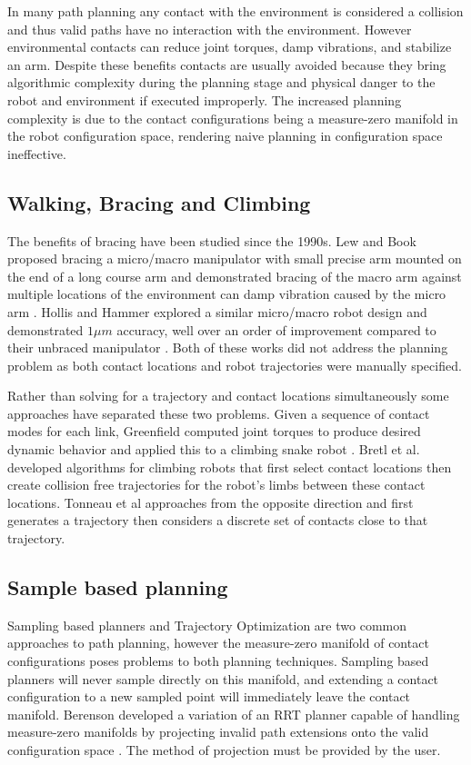 \documentclass[../thesis.tex]{subfiles}
\begin{document}
In many path planning any contact with the environment is considered a collision and thus valid paths have no interaction with the environment.
However environmental contacts can reduce joint torques, damp vibrations, and stabilize an arm.
Despite these benefits contacts are usually avoided because they bring algorithmic complexity during the planning stage and physical danger to the robot and environment if executed improperly.
The increased planning complexity is due to the contact configurations being a measure-zero manifold in the robot configuration space, rendering naive planning in configuration space ineffective. 


\subsection{Walking, Bracing and Climbing}
The benefits of bracing have been studied since the 1990s.
Lew and Book proposed bracing a micro/macro manipulator with small precise arm mounted on the end of a long course arm and demonstrated bracing of the macro arm against multiple locations of the environment can damp vibration caused by the micro arm \cite{Book1994} \cite{Lew1993}.
Hollis and Hammer explored a similar micro/macro robot design and demonstrated $1 \mu m$ accuracy, well over an order of improvement compared to their unbraced manipulator \cite{Hollis1992}.
Both of these works did not address the planning problem as both contact locations and robot trajectories were manually specified.


Rather than solving for a trajectory and contact locations simultaneously some approaches have separated these two problems.
Given a sequence of contact modes for each link, Greenfield computed joint torques to produce desired dynamic behavior and applied this to a climbing snake robot \cite{Greenfield2005}.
Bretl et al. \cite{Bretl2006} developed algorithms for climbing robots that first select contact locations then create collision free trajectories for the robot's limbs between these contact locations.
Tonneau et al \cite{Tonneau} approaches from the opposite direction and first generates a trajectory then considers a discrete set of contacts close to that trajectory.


\subsection{Sample based planning}
Sampling based planners and Trajectory Optimization are two common approaches to path planning, however the measure-zero manifold of contact configurations poses problems to both planning techniques.
Sampling based planners will never sample directly on this manifold, and extending a contact configuration to a new sampled point will immediately leave the contact manifold.
Berenson developed a variation of an RRT planner capable of handling measure-zero manifolds by projecting invalid path extensions onto the valid configuration space \cite{Berenson2009a}.
The method of projection must be provided by the user.
\end{document}
